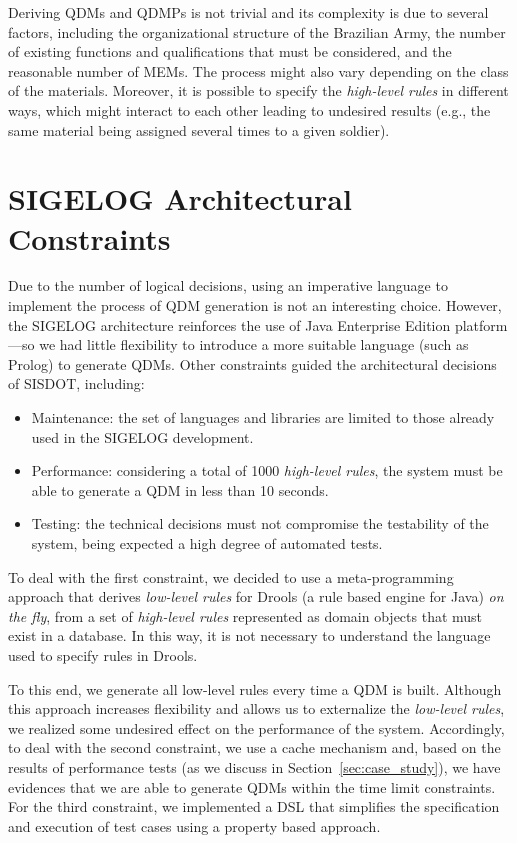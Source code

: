 \documentclass[twocolumn]{bmcart}%
\newcommand{\callers}{\emph{high-level rules}\xspace}
\begin{document}
Deriving QDMs and QDMPs is not trivial and its complexity is due to several factors, including the organizational structure of the Brazilian Army, the number of existing functions and qualifications that must be considered, and the reasonable number of MEMs. The process might also vary depending on the class of the materials. Moreover, it is possible to specify the \callers in different ways, which might interact to each other leading to undesired results (e.g., the same material being assigned several times to a given soldier). 

\section{SIGELOG Architectural Constraints}
\label{sigelog}

Due to the number of logical decisions, using an imperative language to implement the process of QDM generation 
is not an interesting choice. However, the SIGELOG architecture reinforces the use of Java Enterprise Edition platform---so we had little flexibility to introduce a more suitable language (such as Prolog) to generate QDMs. Other constraints guided the architectural decisions of SISDOT, including:  

\begin{itemize}
	\item Maintenance: the set of languages and libraries are limited to those already used in the SIGELOG development.  
	\item Performance: considering a total of 1000 \callers, the system must be able to generate a QDM in less than 10 seconds.
	\item Testing: the technical decisions must not compromise the testability of the system, being expected a high degree of automated tests. 
\end{itemize}

To deal with the first constraint, we decided to use a meta-programming approach that derives \emph{low-level rules} for Drools (a rule based engine for Java) \emph{on the fly}, from a set of \callers represented as domain objects that must exist in a database. In this way, it is not necessary to understand the language used to specify rules in Drools.

To this end, we generate all low-level rules every time a QDM is built.
Although this approach increases flexibility and allows us to externalize the \emph{low-level rules}, we realized some undesired effect on the performance of the system. Accordingly, to deal with the second constraint, we use a cache mechanism and, based on the results of performance tests (as we discuss in Section~\ref{sec:case_study}), we have evidences that we are able to generate QDMs within the time
limit constraints. For the third constraint, we implemented a DSL that simplifies the specification and execution of test cases using a property based approach. 
\end{document}
